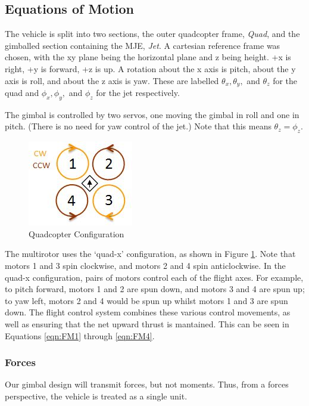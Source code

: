 \documentclass[11pt]{article}
\begin{document}
\subsection{Equations of Motion}
The vehicle is split into two sections, the outer quadcopter frame, \emph{Quad}, and the gimballed section containing the MJE, \emph{Jet}. A cartesian reference frame was chosen, with the xy plane being the horizontal plane and z being height. +x is right, +y is forward, +z is up. A rotation about the x axis is pitch, about the y axis is roll, and about the z axis is yaw. These are labelled $\theta_x, \theta_y,$ and $\theta_z$ for the quad and $\phi_x, \phi_y,$ and $\phi_z$ for the jet respectively.

The gimbal is controlled by two servos, one moving the gimbal in roll and one in pitch. (There is no need for yaw control of the jet.)  Note that this means $\theta_z = \phi_z$.

\begin{figure}
    \begin{center}
        \includegraphics[width=0.48\linewidth]{Quad-X}
        \caption{Quadcopter Configuration}
        \label{fig:quad-x}
    \end{center}
\end{figure}

The multirotor uses the `quad-x' configuration, as shown in Figure \ref{fig:quad-x}. Note that motors 1 and 3 spin clockwise, and motors 2 and 4 spin anticlockwise. In the quad-x configuration, pairs of motors control each of the flight axes. For example, to pitch forward, motors 1 and 2 are spun down, and motors 3 and 4 are spun up; to yaw left, motors 2 and 4 would be spun up whilst motors 1 and 3 are spun down. The flight control system combines these various control movements, as well as ensuring that the net upward thrust is mantained. This can be seen in Equations \ref{eqn:FM1} through \ref{eqn:FM4}.


\subsubsection{Forces}\label{sec:Forces}
Our gimbal design will transmit forces, but not moments. Thus, from a forces perspective, the vehicle is treated as a single unit.
\end{document}
